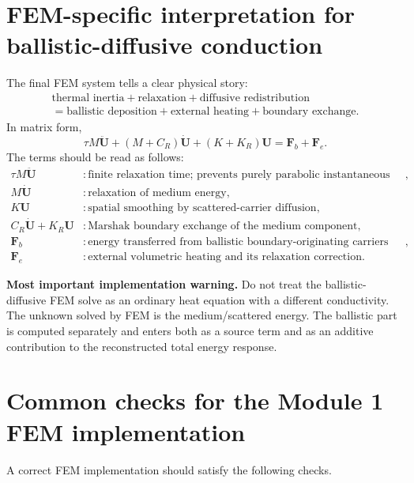 \documentclass[11pt]{article}
\begin{document}
\section{FEM-specific interpretation for ballistic-diffusive conduction}
The final FEM system tells a clear physical story:
\begin{equation}
\begin{gathered}
    \text{thermal inertia}+\text{relaxation}+\text{diffusive redistribution}\\
    =\text{ballistic deposition}+\text{external heating}+\text{boundary exchange}.
\end{gathered}
\end{equation}
In matrix form,
\begin{equation}
    \tau M\ddot{\bm{U}}+(M+C_R)\dot{\bm{U}}+(K+K_R)\bm{U}=\bm{F}_{b}+\bm{F}_{e}.
\end{equation}
The terms should be read as follows:
\begin{align}
    \tau M\ddot{\bm{U}} &: \text{finite relaxation time; prevents purely parabolic instantaneous response},\\
    M\dot{\bm{U}} &: \text{relaxation of medium energy},\\
    K\bm{U} &: \text{spatial smoothing by scattered-carrier diffusion},\\
    C_R\dot{\bm{U}}+K_R\bm{U} &: \text{Marshak boundary exchange of the medium component},\\
    \bm{F}_b &: \text{energy transferred from ballistic boundary-originating carriers into the medium},\\
    \bm{F}_e &: \text{external volumetric heating and its relaxation correction}.
\end{align}

\begin{physicsbox}
\textbf{Most important implementation warning.} Do not treat the ballistic-diffusive FEM solve as an ordinary heat equation with a different conductivity. The unknown solved by FEM is the medium/scattered energy. The ballistic part is computed separately and enters both as a source term and as an additive contribution to the reconstructed total energy response.
\end{physicsbox}

\section{Common checks for the Module 1 FEM implementation}
A correct FEM implementation should satisfy the following checks.
\end{document}
